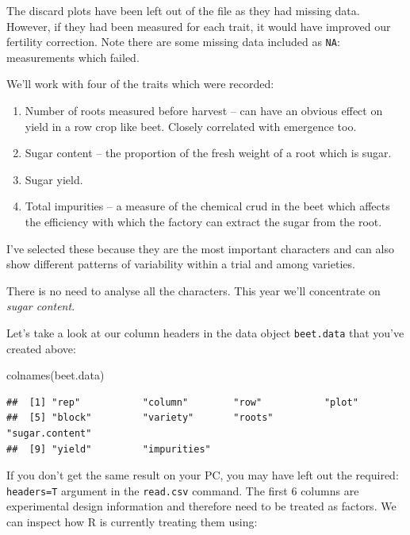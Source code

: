 \documentclass[
]{book}
\newenvironment{Shaded}{\begin{snugshade}}{\end{snugshade}}
\newcommand{\FunctionTok}[1]{\textcolor[rgb]{0.00,0.00,0.00}{#1}}
\newcommand{\NormalTok}[1]{#1}
\begin{document}
The discard plots have been left out of the file as they had missing data. However, if they had been measured for each trait, it would have improved our fertility correction. Note there are some missing data included as \texttt{NA}: measurements which failed.

We'll work with four of the traits which were recorded:

\begin{enumerate}
\def\labelenumi{\arabic{enumi}.}
\item
  Number of roots measured before harvest -- can have an obvious effect on yield in a row crop like beet. Closely correlated with emergence too.
\item
  Sugar content -- the proportion of the fresh weight of a root which is sugar.
\item
  Sugar yield.
\item
  Total impurities -- a measure of the chemical crud in the beet which affects the efficiency with which the factory can extract the sugar from the root.
\end{enumerate}

I've selected these because they are the most important characters and can also show different patterns of variability within a trial and among varieties.

There is no need to analyse all the characters. This year we'll concentrate on \emph{sugar content}.

Let's take a look at our column headers in the data object \texttt{beet.data} that you've created above:

\begin{Shaded}
\begin{Highlighting}[]
\FunctionTok{colnames}\NormalTok{(beet.data)}
\end{Highlighting}
\end{Shaded}

\begin{verbatim}
##  [1] "rep"           "column"        "row"           "plot"         
##  [5] "block"         "variety"       "roots"         "sugar.content"
##  [9] "yield"         "impurities"
\end{verbatim}

If you don't get the same result on your PC, you may have left out the required: \texttt{headers=T} argument in the \texttt{read.csv} command. The first 6 columns are experimental design information and therefore need to be treated as factors. We can inspect how R is currently treating them using:
\end{document}

